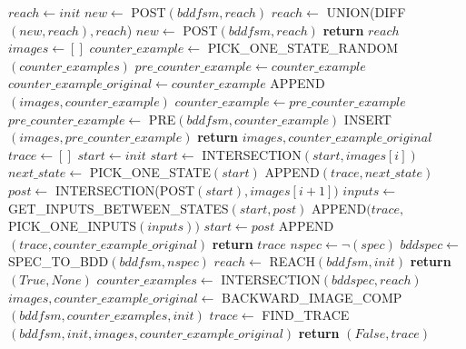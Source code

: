 \documentclass{article}
\begin{document}
\begin{algorithmic}

    \State $reach\leftarrow init$
    \State $new\leftarrow$ POST$(bddfsm, reach)$
        \State $reach\leftarrow$ UNION(DIFF$(new, reach),reach$)
        \State $new\leftarrow$ POST$(bddfsm, reach)$
    \EndWhile
    \State \textbf{return }$reach$
\EndFunction
\\
    \State $images \leftarrow []$
    \State $counter\_example \leftarrow$ PICK\_ONE\_STATE\_RANDOM$(counter\_examples)$
    \State $pre\_counter\_example \leftarrow counter\_example$
    \State $counter\_example\_original \leftarrow counter\_example$
    \State APPEND$(images, counter\_example)$
        \State $counter\_example \leftarrow pre\_counter\_example$
        \State $pre\_counter\_example \leftarrow$ PRE$(bddfsm, counter\_example)$
        \State INSERT$(images, pre\_counter\_example)$
    \EndWhile
    \State \textbf{return }$images, counter\_example\_original$
\EndFunction
\\
    \State $trace \leftarrow []$
    \State $start \leftarrow init$
     
        \State $start \leftarrow$ INTERSECTION$(start, images[i])$
        \State $next\_state \leftarrow$ PICK\_ONE\_STATE$(start)$
        \State APPEND$(trace, next\_state)$
        \State $post \leftarrow$ INTERSECTION(POST$(start), images[i+1])$
        \State $inputs \leftarrow$ GET\_INPUTS\_BETWEEN\_STATES$(start, post)$
        \State APPEND$(trace,$ PICK\_ONE\_INPUTS$(inputs))$
        \State $start \leftarrow post$
    \EndFor
    \State APPEND$(trace, counter\_example\_original)$
    \State \textbf{return }$trace$
\EndFunction
\newpage
{}
    \State $nspec \leftarrow \neg(spec)$
    \State $bddspec \leftarrow$ SPEC\_TO\_BDD$(bddfsm, nspec)$
    \State $reach \leftarrow$ REACH$(bddfsm, init)$
        \State \textbf{return }$(True, None)$
    \Else
        \State $counter\_examples \leftarrow$ INTERSECTION$(bddspec, reach)$
        \State $images,counter\_example\_original \leftarrow$ \newline
                \hspace*{5em}BACKWARD\_IMAGE\_COMP$(bddfsm, counter\_examples, init)$
        \State $trace \leftarrow$ \newline
                \hspace*{5em}FIND\_TRACE$(bddfsm, init, images, counter\_example\_original)$
        \State \textbf{return }$(False, trace)$
    \EndIf
\EndFunction
\end{algorithmic}
\end{document}
